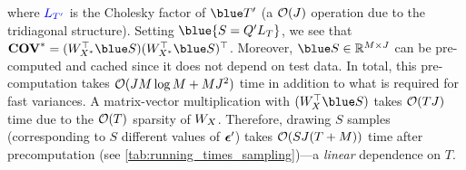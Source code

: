 where ${\color{blue} L_{T'} }$ is the Cholesky factor of $\blue \bT'$ (a $\bigo{J}$ operation due to the tridiagonal structure).
Setting $\blue{ \bS = \bQ' \bL_{\bT} }$, we see that $\Covtest = (\bW_{\bXtest}^\top {\blue \bS}) (\bW_{\bXtest}^\top {\blue \bS})^{\top}$.
Moreover, ${\blue \bS} \in \reals^{M \times J}$ can be pre-computed and cached since it does not depend on test data.
In total, this pre-computation takes $\bigo{J M \log M + M J^2}$ time in addition to what is required for fast variances.
A matrix-vector multiplication with $(\bW_\bX^\top {\blue \bS})$ takes $\bigo{TJ}$ time due to the $\bigo{T}$ sparsity of $W_{X}$.
Therefore, drawing $S$ samples (corresponding to $S$ different values of $\boldsymbol{\epsilon}'$) takes $\bigo{SJ(T + M)}$ time after precomputation (see \cref{tab:running_times_sampling})---a \emph{linear} dependence on $T$.



